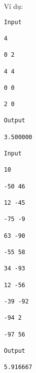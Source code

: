 Ví dụ:
\begin{verbatim}
Input

4

0 2

4 4

0 0

2 0

Output

3.500000

Input

10

-50 46

12 -45

-75 -9

63 -90

-55 58

34 -93

12 -56

-39 -92

-94 2

-97 56

Output

5.916667\end{verbatim}